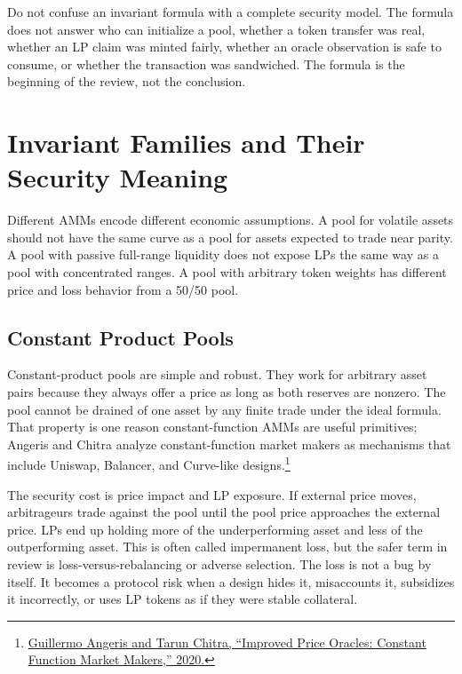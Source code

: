 Do not confuse an invariant formula with a complete security model. The formula does not answer who can initialize a pool, whether a token transfer was real, whether an LP claim was minted fairly, whether an oracle observation is safe to consume, or whether the transaction was sandwiched. The formula is the beginning of the review, not the conclusion.

\section{Invariant Families and Their Security Meaning}

Different AMMs encode different economic assumptions. A pool for volatile assets should not have the same curve as a pool for assets expected to trade near parity. A pool with passive full-range liquidity does not expose LPs the same way as a pool with concentrated ranges. A pool with arbitrary token weights has different price and loss behavior from a 50/50 pool.

\subsection{Constant Product Pools}

Constant-product pools are simple and robust. They work for arbitrary asset pairs because they always offer a price as long as both reserves are nonzero. The pool cannot be drained of one asset by any finite trade under the ideal formula. That property is one reason constant-function AMMs are useful primitives; Angeris and Chitra analyze constant-function market makers as mechanisms that include Uniswap, Balancer, and Curve-like designs.\footnote{\href{https://arxiv.org/abs/2003.10001}{Guillermo Angeris and Tarun Chitra, ``Improved Price Oracles: Constant Function Market Makers,'' 2020.}}

The security cost is price impact and LP exposure. If external price moves, arbitrageurs trade against the pool until the pool price approaches the external price. LPs end up holding more of the underperforming asset and less of the outperforming asset. This is often called impermanent loss, but the safer term in review is loss-versus-rebalancing or adverse selection. The loss is not a bug by itself. It becomes a protocol risk when a design hides it, misaccounts it, subsidizes it incorrectly, or uses LP tokens as if they were stable collateral.


